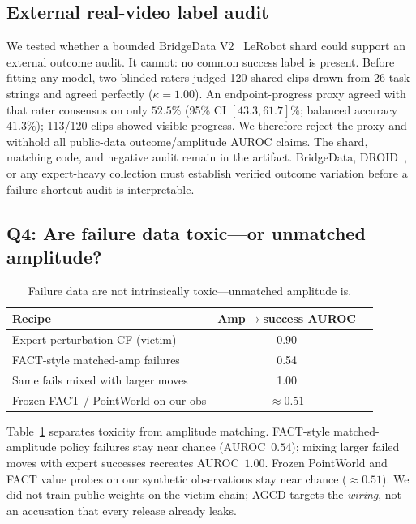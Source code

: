 \documentclass[conference]{IEEEtran}
\begin{document}
\subsection{External real-video label audit}
\label{sec:public_audit}

We tested whether a bounded BridgeData V2~\cite{bridgedata2023} LeRobot shard
could support an external outcome audit. It cannot: no common success label is
present. Before fitting any model, two blinded raters judged 120 shared clips
drawn from 26 task strings and agreed perfectly ($\kappa{=}1.00$). An
endpoint-progress proxy agreed with that rater consensus on only $52.5\%$
(95\% CI $[43.3,61.7]\%$; balanced accuracy $41.3\%$); 113/120 clips showed
visible progress. We therefore
reject the proxy and withhold all public-data outcome/amplitude AUROC claims.
The shard, matching code, and negative audit remain in the artifact. BridgeData,
DROID~\cite{khazatsky2024droid}, or any expert-heavy collection must establish
verified outcome variation before a failure-shortcut audit is interpretable.

\subsection{Q4: Are failure data toxic---or unmatched amplitude?}
\label{sec:q4}

\begin{table}[t]
\centering
\caption{Failure data are not intrinsically toxic---unmatched amplitude is.}
\label{tab:fact}
\begin{tabular}{lcc}
\toprule
\rowcolor{hdr}
Recipe & Amp$\rightarrow$success AUROC \\
\midrule
Expert-perturbation CF (victim) & 0.90 \\
FACT-style matched-amp failures & 0.54 \\
Same fails mixed with larger moves & 1.00 \\
Frozen FACT / PointWorld on our obs & $\approx 0.51$ \\
\bottomrule
\end{tabular}
\end{table}

Table~\ref{tab:fact} separates toxicity from amplitude matching. FACT-style
matched-amplitude policy failures stay near chance (AUROC~$0.54$); mixing larger
failed moves with expert successes recreates AUROC~$1.00$. Frozen PointWorld
and FACT value probes on our synthetic observations stay near chance
($\approx 0.51$). We did not train public weights on the victim chain; AGCD
targets the \emph{wiring}, not an accusation that every release already leaks.
\end{document}
